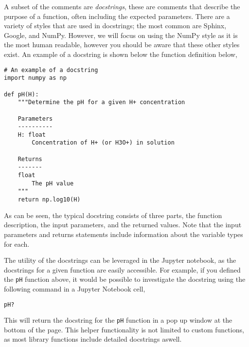 \documentclass[a4paper]{article}
\begin{document}
A subset of the comments are \emph{docstrings}, these are comments that describe the purpose of a function, often including the expected parameters.
There are a variety of styles that are used in docstrings; the most common are Sphinx, Google, and NumPy.
However, we will focus on using the NumPy style as it is the most human readable, however you should be aware that these other styles exist.
An example of a docstring is shown below the function definition below,
\begin{lstlisting}
# An example of a docstring
import numpy as np

def pH(H):
    """Determine the pH for a given H+ concentration

    Parameters
    ----------
    H: float
        Concentration of H+ (or H3O+) in solution

    Returns
    -------
    float
        The pH value
    """
    return np.log10(H)
\end{lstlisting}
As can be seen, the typical docstring consists of three parts, the function description, the input parameters, and the returned values.
Note that the input parameters and returns statements include information about the variable types for each.

The utility of the docstrings can be leveraged in the Jupyter notebook, as the docstrings for a given function are easily accessible.
For example, if you defined the \texttt{pH} function above, it would be possible to investigate the docstring using the following command in a Jupyter Notebook cell,
\begin{lstlisting}
pH?
\end{lstlisting}
This will return the docstring for the \texttt{pH} function in a pop up window at the bottom of the page.
This helper functionality is not limited to custom functions, as most library functions include detailed docstrings aswell.

\vspace{\baselineskip}
\begin{center}
	\noindent{}
\end{center}
\end{document}

